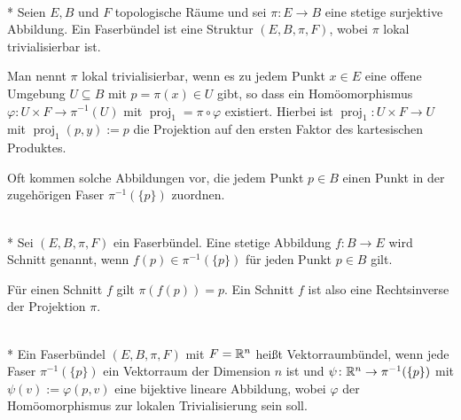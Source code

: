 \begin{definition}[Faserbündel]\mbox{}\\*
Seien $E,B$ und $F$ topologische Räume und sei $\pi\colon E\to B$
eine stetige surjektive Abbildung. Ein Faserbündel ist eine Struktur
$(E,B,\pi,F)$, wobei $\pi$ lokal trivialisierbar ist.

Man nennt $\pi$ lokal trivialisierbar, wenn es zu jedem Punkt
$x\in E$ eine offene Umgebung $U\subseteq B$ mit $p=\pi(x)\in U$
gibt, so dass ein Homöomorphismus $\varphi\colon U\times F\to\pi^{-1}(U)$
mit $\operatorname{proj}_1 = \pi\circ\varphi$ existiert. Hierbei
ist $\operatorname{proj}_1\colon U\times F\to U$ mit
$\operatorname{proj}_1(p,y):=p$ die Projektion auf den ersten Faktor
des kartesischen Produktes.
\end{definition}

\noindent
Oft kommen solche Abbildungen vor, die jedem Punkt $p\in B$ einen Punkt
in der zugehörigen Faser $\pi^{-1}(\{p\})$ zuordnen.

\begin{definition}[Schnitt]\mbox{}\\*
Sei $(E,B,\pi,F)$ ein Faserbündel. Eine stetige Abbildung
$f\colon B\to E$ wird Schnitt genannt, wenn $f(p)\in\pi^{-1}(\{p\})$
für jeden Punkt $p\in B$ gilt.
\end{definition}

\noindent
Für einen Schnitt $f$ gilt $\pi(f(p))=p$. Ein Schnitt $f$ ist also eine
Rechtsinverse der Projektion $\pi$.

\begin{definition}[Vektorraumbündel]\mbox{}\\*
Ein Faserbündel $(E,B,\pi,F)$ mit $F=\mathbb R^n$ heißt Vektorraumbündel, wenn
jede Faser $\pi^{-1}(\{p\})$ ein Vektorraum der Dimension $n$ ist und
$\psi\colon\mathbb R^n\to\pi^{-1}(\{p\})$ mit $\psi(v):=\varphi(p,v)$
eine bijektive lineare Abbildung, wobei $\varphi$ der Homöomorphismus
zur lokalen Trivialisierung sein soll.
\end{definition}




